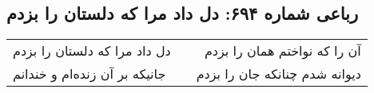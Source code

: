 \begin{center}
\section*{رباعی شماره ۶۹۴: دل داد مرا که دلستان را بزدم}
\label{sec:0694}
\begin{longtable}{l p{0.5cm} r}
دل داد مرا که دلستان را بزدم
&&
آن را که نواختم همان را بزدم
\\
جانیکه بر آن زنده‌ام و خندانم
&&
دیوانه شدم چنانکه جان را بزدم
\\
\end{longtable}
\end{center}

